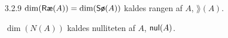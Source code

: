 %

\begin{notation}{3.2.9}
	$\dim(\row{A}) = \dim(\sor{A})$ kaldes rangen af $A$, $\rang(A)$.
	
	$\dim(N(A))$ kaldes nulliteten af $A$, $\nul(A)$.
\end{notation}
